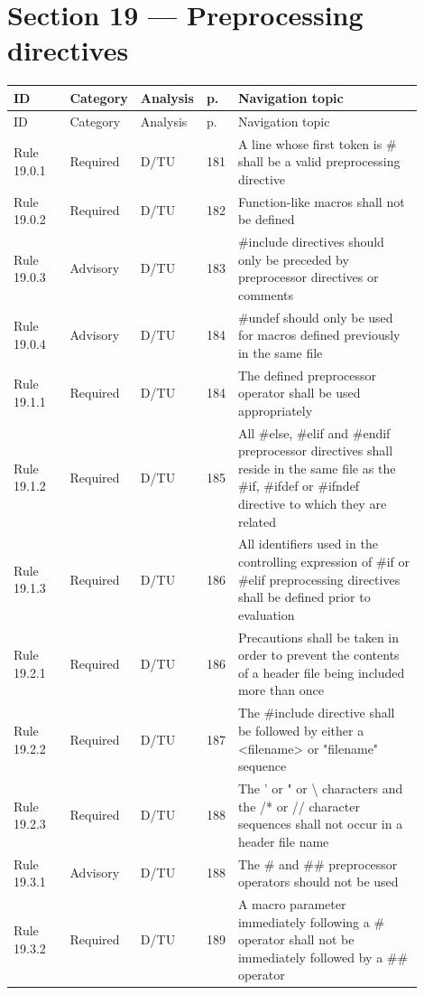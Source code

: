 \documentclass[10pt,letterpaper]{article}
\begin{document}
\section{Section 19 --- Preprocessing directives}
\small\setlength{\tabcolsep}{3pt}\renewcommand{\arraystretch}{1.15}
\begin{longtable}{p{0.14\linewidth}p{0.14\linewidth}p{0.1\linewidth}p{0.045\linewidth}p{0.475\linewidth}}
\toprule
ID & Category & Analysis & p. & Navigation topic\\ \midrule
\endfirsthead
\toprule
ID & Category & Analysis & p. & Navigation topic\\ \midrule
\endhead
Rule 19.0.1 & Required & D/TU & 181 & A line whose first token is \# shall be a valid preprocessing directive\\
Rule 19.0.2 & Required & D/TU & 182 & Function-like macros shall not be defined\\
Rule 19.0.3 & Advisory & D/TU & 183 & \#include directives should only be preceded by preprocessor directives or comments\\
Rule 19.0.4 & Advisory & D/TU & 184 & \#undef should only be used for macros defined previously in the same file\\
Rule 19.1.1 & Required & D/TU & 184 & The defined preprocessor operator shall be used appropriately\\
Rule 19.1.2 & Required & D/TU & 185 & All \#else, \#elif and \#endif preprocessor directives shall reside in the same file as the \#if, \#ifdef or \#ifndef directive to which they are related\\
Rule 19.1.3 & Required & D/TU & 186 & All identifiers used in the controlling expression of \#if or \#elif preprocessing directives shall be defined prior to evaluation\\
Rule 19.2.1 & Required & D/TU & 186 & Precautions shall be taken in order to prevent the contents of a header file being included more than once\\
Rule 19.2.2 & Required & D/TU & 187 & The \#include directive shall be followed by either a \textless{}filename\textgreater{} or "filename" sequence\\
Rule 19.2.3 & Required & D/TU & 188 & The ' or " or \textbackslash{} characters and the /* or // character sequences shall not occur in a header file name\\
Rule 19.3.1 & Advisory & D/TU & 188 & The \# and \#\# preprocessor operators should not be used\\
Rule 19.3.2 & Required & D/TU & 189 & A macro parameter immediately following a \# operator shall not be immediately followed by a \#\# operator\\

\end{longtable}
\end{document}
